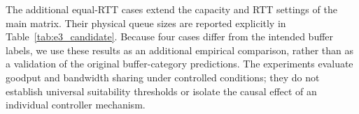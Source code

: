 The additional equal-RTT cases extend the capacity and RTT settings of
the main matrix. Their physical queue sizes are reported explicitly in
Table~\ref{tab:e3_candidate}. Because four cases differ from the intended
buffer labels, we use these results as an additional empirical comparison,
rather than as a validation of the original buffer-category predictions.
The experiments evaluate goodput and bandwidth sharing under controlled
conditions; they do not establish universal suitability thresholds or
isolate the causal effect of an individual controller mechanism.


